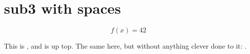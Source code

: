 \documentclass{scrartcl}
\begin{document}
\section{sub3 with spaces}

\begin{equation}
  f(x) = 42
  \label{eq:sub3 with spaces}
\end{equation}

This is , and  is up top.
The same here, but without anything clever done to it: .
\end{document}
